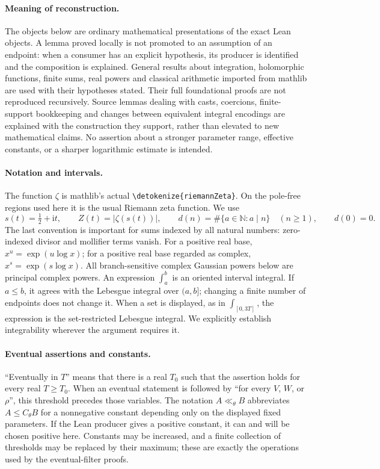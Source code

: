 \documentclass[11pt,a4paper]{article}
\numberwithin{equation}{section}
\theoremstyle{definition}
\newcommand{\N}{\mathbb N}
\newcommand{\ii}{\mathrm i}
\newcommand{\lean}[1]{\ifmmode\text{\ttfamily\detokenize{#1}}\else\expandafter\nolinkurl\expandafter{\detokenize{#1}}\fi}
\newcommand{\zabs}{Z}
\begin{document}
\paragraph{Meaning of reconstruction.}
The objects below are ordinary mathematical presentations of the exact Lean
objects. A lemma proved locally is not promoted to an assumption of an endpoint:
when a consumer has an explicit hypothesis, its producer is identified and the
composition is explained. General results about integration, holomorphic
functions, finite sums, real powers and classical arithmetic imported from
mathlib are used with their hypotheses stated. Their full foundational proofs
are not reproduced recursively. Source lemmas dealing with casts, coercions,
finite-support bookkeeping and changes between equivalent integral encodings
are explained with the construction they support, rather than elevated to new
mathematical claims. No assertion about a stronger parameter range, effective
constants, or a sharper logarithmic estimate is intended.

\paragraph{Notation and intervals.}
The function $\zeta$ is mathlib's actual \lean{riemannZeta}. On the pole-free
regions used here it is the usual Riemann zeta function. We use
\[
 s(t)=\tfrac12+\ii t,\qquad \zabs(t)=|\zeta(s(t))|,\qquad d(n)=\#\{a\in\N:a\mid n\}
 \quad(n\ge1),\qquad d(0)=0.
\]
The last convention is important for sums indexed by all natural numbers:
zero-indexed divisor and mollifier terms vanish. For a positive real base,
$x^u=\exp(u\log x)$; for a positive real base regarded as complex,
$x^s=\exp(s\log x)$. All branch-sensitive complex Gaussian powers below are
principal complex powers. An expression $\int_a^b$ is an oriented interval
integral. If $a\le b$, it agrees with the Lebesgue integral over $(a,b]$;
changing a finite number of endpoints does not change it. When a set is displayed,
as in $\int_{[0,3T]}$, the expression is the set-restricted Lebesgue integral.
We explicitly establish integrability wherever the argument requires it.

\paragraph{Eventual assertions and constants.}
``Eventually in $T$'' means that there is a real $T_0$ such that the assertion
holds for every real $T\ge T_0$. When an eventual statement is followed by
``for every $V$, $W$, or $\rho$'', this threshold precedes those variables.
The notation $A\ll_\theta B$ abbreviates $A\le C_\theta B$ for a nonnegative
constant depending only on the displayed fixed parameters. If the Lean producer
gives a positive constant, it can and will be chosen positive here. Constants
may be increased, and a finite collection of thresholds may be replaced by their
maximum; these are exactly the operations used by the eventual-filter proofs.
\end{document}
